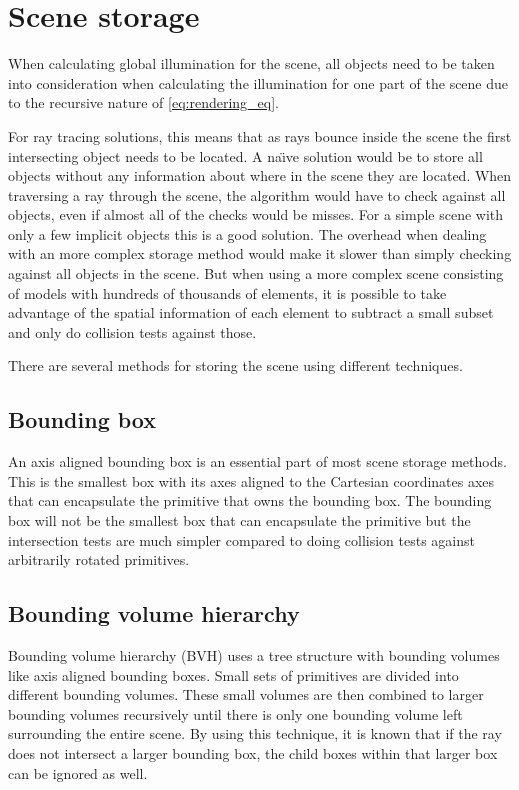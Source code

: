 \documentclass[]{report}   %
\begin{document}
\section{Scene storage}
When calculating global illumination for the scene, all objects need to be taken into consideration when calculating the illumination for one part of the scene due to the recursive nature of \autoref{eq:rendering_eq}.

For ray tracing solutions, this means that as rays bounce inside the scene the first intersecting object needs to be located.
A na\"{\i}ve solution would be to store all objects without any information about where in the scene they are located.
When traversing a ray through the scene, the algorithm would have to check against all objects, even if almost all of the checks would be misses.
For a simple scene with only a few implicit objects this is a good solution. The overhead when dealing with an more complex storage method would make it slower than simply checking against all objects in the scene.
But when using a more complex scene consisting of models with hundreds of thousands of elements, it is possible to take advantage of the spatial information of each element to subtract a small subset and only do collision tests against those.

There are several methods for storing the scene using different techniques.

\subsection{Bounding box}
An axis aligned bounding box is an essential part of most scene storage methods.
This is the smallest box with its axes aligned to the Cartesian coordinates axes that can encapsulate the primitive that owns the bounding box.
The bounding box will not be the smallest box that can encapsulate the primitive but the intersection tests are much simpler compared to doing collision tests against arbitrarily rotated primitives.

\subsection{Bounding volume hierarchy}
Bounding volume hierarchy (BVH) uses a tree structure with bounding volumes like axis aligned bounding boxes. 
Small sets of primitives are divided into different bounding volumes.
These small volumes are then combined to larger bounding volumes recursively until there is only one bounding volume left surrounding the entire scene.
By using this technique, it is known that if the ray does not intersect a larger bounding box, the child boxes within that larger box can be ignored as well.
\end{document}
